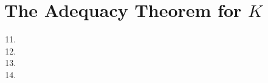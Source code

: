 \section{The Adequacy Theorem for \texorpdfstring{\(K\)}{K}}

\solutions{}
\begin{enumerate}
  \setcounter{enumi}{10}
  \item %
  \item %
  \item %
  \item %
\end{enumerate}
